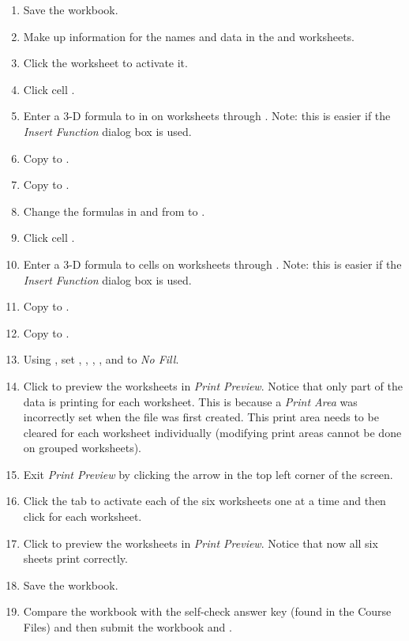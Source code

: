 \begin{enumerate}[resume]
	\item Save the workbook.
	\item Make up information for the names and data in the  and  worksheets.
	\item Click the  worksheet to activate it.

	\item Click cell . 
	\item Enter a $ 3 $-D formula to  in  on worksheets  through . Note: this is easier if the \textit{Insert Function} dialog box is used.
	\item Copy  to .
	\item Copy  to .
	\item Change the formulas in  and  from  to .
	\item Click cell . 
	\item Enter a $ 3 $-D formula to  cells  on worksheets  through . Note: this is easier if the \textit{Insert Function} dialog box is used.
	\item Copy  to .
	\item Copy  to .
	\item Using , set , , , , and  to \textit{No Fill}. 
	\item Click  to preview the worksheets in \textit{Print Preview}. Notice that only part of the data is printing for each worksheet. This is because a \textit{Print Area} was incorrectly set when the file was first created. This print area needs to be cleared for each worksheet individually (modifying print areas cannot be done on grouped worksheets). 
	\item Exit \textit{Print Preview} by clicking the arrow in the top left corner of the screen. 
	\item Click the tab to activate each of the six worksheets one at a time and then click  for each worksheet.
	\item Click  to preview the worksheets in \textit{Print Preview}. Notice that now all six sheets print correctly.
	\item Save the  workbook.
	\item Compare the workbook with the self-check answer key (found in the Course Files) and then submit the  workbook and .
\end{enumerate}

